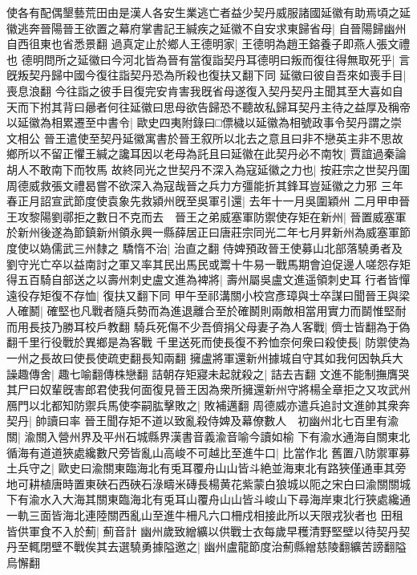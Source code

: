 使各有配偶墾藝荒田由是漢人各安生業逃亡者益少契丹威服諸國延徽有助焉頃之延徽逃奔晉陽晉王欲置之幕府掌書記王緘疾之延徽不自安求東歸省母|{
	自晉陽歸幽州自西徂東也省悉景翻}
過真定止於鄉人王德明家|{
	王德明為趙王鎔養子即燕人張文禮也}
德明問所之延徽曰今河北皆為晉有當復詣契丹耳德明曰叛而復往得無取死乎|{
	言旣叛契丹歸中國今復往詣契丹恐為所殺也復扶又翻下同}
延徽曰彼自吾來如喪手目|{
	喪息浪翻}
今往詣之彼手目復完安肯害我旣省母遂復入契丹契丹主聞其至大喜如自天而下拊其背曰曏者何往延徽曰思母欲告歸恐不聽故私歸耳契丹主待之益厚及稱帝以延徽為相累遷至中書令|{
	歐史四夷附錄曰□僄檅以延徽為相號政事令契丹謂之崇文相公}
晉王遣使至契丹延徽寓書於晉王叙所以北去之意且曰非不戀英主非不思故鄉所以不留正懼王緘之讒耳因以老母為託且曰延徽在此契丹必不南牧|{
	賈誼過秦論胡人不敢南下而牧馬}
故終同光之世契丹不深入為寇延徽之力也|{
	按莊宗之世契丹圍周德威救張文禮曷嘗不欲深入為寇哉晉之兵力方彊能折其鋒耳豈延徽之力邪}
三年春正月詔宣武節度使袁象先救潁州旣至吳軍引還|{
	去年十一月吳圍穎州}
二月甲申晉王攻黎陽劉鄩拒之數日不克而去　晉王之弟威塞軍防禦使存矩在新州|{
	晉置威塞軍於新州後遂為節鎮新州領永興一縣薛居正曰唐莊宗同光二年七月昇新州為威塞軍節度使以媯儒武三州隸之}
驕惰不治|{
	治直之翻}
侍婢預政晉王使募山北部落驍勇者及劉守光亡卒以益南討之軍又率其民出馬民或鬻十牛易一戰馬期會迫促邊人嗟怨存矩得五百騎自部送之以壽州刺史盧文進為裨將|{
	壽州屬吳盧文進遥領刺史耳}
行者皆憚遠役存矩復不存恤|{
	復扶又翻下同}
甲午至祁溝關小校宫彥璋與士卒謀曰聞晉王與梁人確鬭|{
	確堅也凡戰者隨兵勢而為進退離合至於確鬭則兩敵相當用實力而鬬惟堅耐而用長技乃勝耳校戶教翻}
騎兵死傷不少吾儕捐父母妻子為人客戰|{
	儕士皆翻為于偽翻千里行役戰於異鄉是為客戰}
千里送死而使長復不矜恤奈何衆曰殺使長|{
	防禦使為一州之長故曰使長使疏吏翻長知兩翻}
擁盧將軍還新州據城自守其如我何因執兵大譟趣傳舍|{
	趣七喻翻傳株戀翻}
詰朝存矩寢未起就殺之|{
	詰去吉翻}
文進不能制撫膺哭其尸曰奴輩旣害郎君使我何面復見晉王因為衆所擁還新州守將楊全章拒之又攻武州鴈門以北都知防禦兵馬使李嗣肱擊敗之|{
	敗補邁翻}
周德威亦遣兵追討文進帥其衆奔契丹|{
	帥讀曰率}
晉王聞存矩不道以致亂殺侍婢及幕僚數人　初幽州北七百里有渝關|{
	渝關入營州界及平州石城縣界漢書音義渝音喻今讀如榆}
下有渝水通海自關東北循海有道道狹處纔數尺旁皆亂山高峻不可越比至進牛口|{
	比當作北}
舊置八防禦軍募土兵守之|{
	歐史曰渝關東臨海北有兎耳覆舟山山皆斗絶並海東北有路狹僅通車其旁地可耕植唐時置東硤石西硤石淥疇米磚長楊黄花紫蒙白狼城以阨之宋白曰渝關關城下有渝水入大海其關東臨海北有兎耳山覆舟山山皆斗峻山下尋海岸東北行狹處纔通一軌三面皆海北連陸關西亂山至進牛柵凡六口柵戍相接此所以天限戎狄者也}
田租皆供軍食不入於薊|{
	薊音計}
幽州歲致繒纊以供戰士衣每歲早穫清野堅壁以待契丹契丹至輒閉壁不戰俟其去選驍勇據隘邀之|{
	幽州盧龍節度治薊縣繒慈陵翻纊苦謗翻隘烏懈翻}
